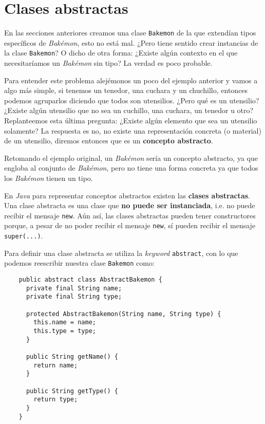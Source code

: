 \section{Clases abstractas}
  En las secciones anteriores creamos una clase \texttt{Bakemon} de la que extendían tipos 
  específicos de \textit{Bakémon}, esto no está mal.
  ¿Pero tiene sentido crear instancias de la clase \texttt{Bakemon}?
  O dicho de otra forma: ¿Existe algún contexto en el que necesitaríamos un \textit{Bakémon} sin 
  tipo?
  La verdad es poco probable.

  Para entender este problema alejémonos un poco del ejemplo anterior y vamos a algo más simple, si
  tenemos un tenedor, una cuchara y un chuchillo, entonces podemos agruparlos diciendo que todos son 
  utensilios.
  ¿Pero qué es un utensilio?
  ¿Existe algún utensilio que no sea un cuchillo, una cuchara, un tenedor u otro?
  Replanteemos esta última pregunta: ¿Existe algún elemento que sea un utensilio solamente?
  La respuesta es no, no existe una representación concreta (o material) de un utensilio, diremos
  entonces que es un \textbf{concepto abstracto}.

  Retomando el ejemplo original, un \textit{Bakémon} sería un concepto abstracto, ya que engloba al
  conjunto de \textit{Bakémon}, pero no tiene una forma concreta ya que todos los \textit{Bakémon}
  tienen un tipo.

  En \textit{Java} para representar conceptos abstractos existen las \textbf{clases abstractas}.
  Una clase abstracta es una clase que \textbf{no puede ser instanciada}, i.e. no puede recibir el
  mensaje \texttt{new}.
  Aún así, las clases abstractas pueden tener constructores porque, a pesar de no poder recibir el
  mensaje \texttt{new}, sí pueden recibir el mensaje \texttt{super(...)}.

  Para definir una clase abstracta se utiliza la \textit{keyword} \texttt{abstract}, con
  lo que podemos reescribir nuestra clase \texttt{Bakemon} como:

  \begin{verbatim}
    public abstract class AbstractBakemon {
      private final String name;
      private final String type;

      protected AbstractBakemon(String name, String type) {
        this.name = name;
        this.type = type;
      }

      public String getName() {
        return name;
      }

      public String getType() {
        return type;
      }
    }
  \end{verbatim}

